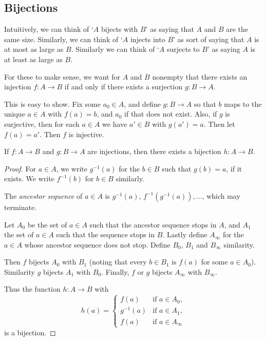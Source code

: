 \subsection{Bijections}

Intuitively, we can think of `$A$ bijects with $B$' as saying that $A$ and $B$ are the same size. Similarly, we can think of `$A$ injects into $B$' as sort of saying that $A$ is at most as large as $B$. Similarly we can think of `$A$ surjects to $B$' as saying $A$ is at least as large as $B$.

For these to make sense, we want for $A$ and $B$ nonempty that there exists an injection $f : A \rightarrow B$ if and only if there exists a surjection $g : B \rightarrow A$.

This is easy to show. Fix some $a_0 \in A$, and define $g: B \rightarrow A$ so that $b$ maps to the unique $a \in A$ with $f(a) = b$, and $a_0$ if that does not exist. Also, if $g$ is surjective, then for each $a \in A$ we have $a' \in B$ with $g(a') = a$. Then let $f(a) = a'$. Then $f$ is injective.

\begin{theorem}
	If $f : A \rightarrow B$ and $g : B \rightarrow A$ are injections, then there exists a bijection $h : A \rightarrow B$.
\end{theorem}
\begin{proof}
	For $a \in A$, we write $g^{-1}(a)$ for the $b \in B$ such that $g(b) = a$, if it exists. We write $f^{-1}(b)$ for $b \in B$ similarly. 

	The \emph{ancestor sequence} of $a \in A$ is $g^{-1}(a)$, $f^{-1}(g^{-1}(a)), \dots$, which may terminate.

	Let $A_0$ be the set of $a \in A$ such that the ancestor sequence stops in $A$, and $A_1$ the set of $a \in A$ such that the sequence stops in $B$. Lastly define $A_\infty$ for the $a \in A$ whose ancestor sequence does not stop. Define $B_0$, $B_1$ and $B_\infty$ similarity.

	Then $f$ bijects $A_0$ with $B_1$ (noting that every $b \in B_1$ is $f(a)$ for some $a \in A_0$). Similarity $g$ bijects $A_1$ with $B_0$. Finally, $f$ or $g$ bijects $A_\infty$ with $B_\infty$.

	Thus the function $h: A \rightarrow B$ with
	$$
	h(a) = \begin{cases}
		f(a) &\mbox{if } a \in A_0, \\
		g^{-1}(a) &\mbox{if } a \in A_1, \\
		f(a) &\mbox{if } a \in A_\infty
	   \end{cases}
	$$
	is a bijection.
\end{proof}

